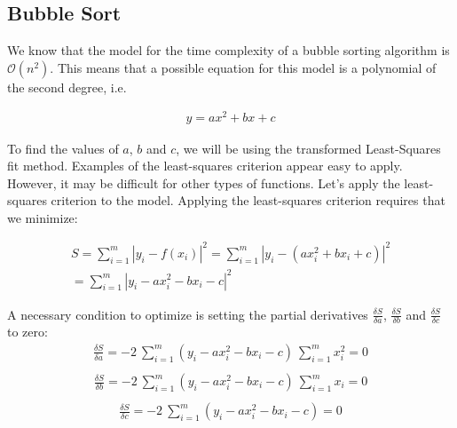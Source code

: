 \documentclass[]{report}
\begin{document}
		 		\subsection{Bubble Sort}
		 		We know that the model for the time complexity of a bubble sorting algorithm is $\mathcal{O}(n^2)$. This means that a possible equation for this model is a polynomial of the second degree, i.e.
		 		\begin{ceqn}
					\begin{align}
		 				y = ax^2 + bx +c
					\end{align}
				\end{ceqn}
		 		To find the values of $a$, $b$ and $c$, we will be using the transformed Least-Squares fit method. Examples of the least-squares criterion appear easy to apply. However, it may be difficult for other types of functions. Let's apply the least-squares criterion to the model. Applying the least-squares criterion requires that we minimize:
		 		\begin{ceqn}
					\begin{align}
		 				S = \sum_{i=1}^{m}|y_i - f(x_i)|^2 = \sum_{i=1}^{m}|y_i - (ax_i^2+bx_i+c)|^2 \\
		 				= \sum_{i=1}^{m}|y_i - ax_i^2 - bx_i - c|^2
					\end{align}
				\end{ceqn}
				A necessary condition to optimize is setting the partial derivatives $\frac{\delta S}{\delta a}$, $\frac{\delta S}{\delta b}$ and $\frac{\delta S}{\delta c}$ to zero:
				\begin{equation}
					\begin{align}
		 				\frac{\delta S}{\delta a} = -2 \ \sum_{i=1}^{m}(y_i - ax_i^2-bx_i-c) \ \sum_{i=1}^{m}x_i^2 = 0\\
					\end{align}
				\end{equation}
				\begin{equation}
					\begin{align}
		 				\frac{\delta S}{\delta b} = -2 \ \sum_{i=1}^{m}(y_i - ax_i^2-bx_i-c) \ \sum_{i=1}^{m}x_i = 0\\
					\end{align}
				\end{equation}
				\begin{equation}
					\begin{align}
		 				\frac{\delta S}{\delta c} = -2 \ \sum_{i=1}^{m}(y_i - ax_i^2-bx_i-c) = 0\\
					\end{align}
				\end{equation}
				
\end{document}
